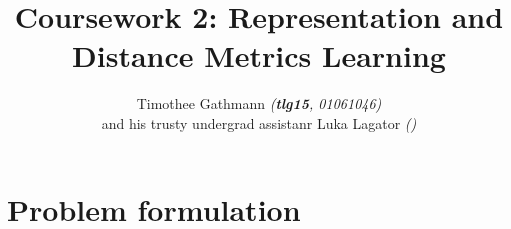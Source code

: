 \documentclass[10pt,technote]{IEEEtran}
\title{Coursework 2: Representation and Distance Metrics Learning }
\author{Timothee Gathmann \textit{(\textbf{tlg15}, 01061046)}\\ and his trusty undergrad assistanr Luka Lagator\textit{ ()}}
\begin{document}
\maketitle

\section{Problem formulation}
\end{document}
